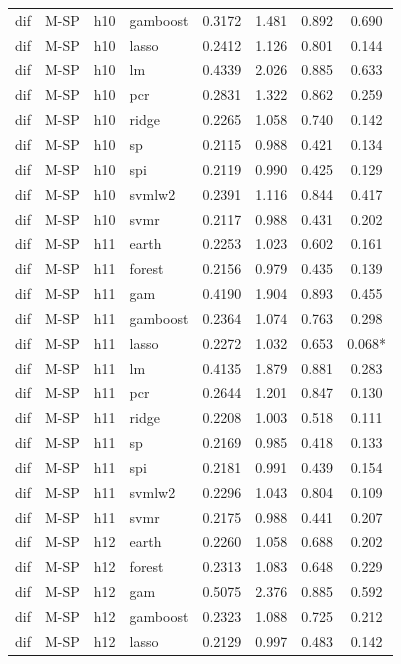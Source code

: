\begin{ThreePartTable}
\begin{longtable}[t]{llclcccc}
dif & M-SP & h10 & gamboost & 0.3172 & 1.481 & 0.892 & 0.690\\
dif & M-SP & h10 & lasso & 0.2412 & 1.126 & 0.801 & 0.144\\
dif & M-SP & h10 & lm & 0.4339 & 2.026 & 0.885 & 0.633\\
dif & M-SP & h10 & pcr & 0.2831 & 1.322 & 0.862 & 0.259\\
dif & M-SP & h10 & ridge & 0.2265 & 1.058 & 0.740 & 0.142\\
dif & M-SP & h10 & sp & 0.2115 & 0.988 & 0.421 & 0.134\\
dif & M-SP & h10 & spi & 0.2119 & 0.990 & 0.425 & 0.129\\
dif & M-SP & h10 & svmlw2 & 0.2391 & 1.116 & 0.844 & 0.417\\
dif & M-SP & h10 & svmr & 0.2117 & 0.988 & 0.431 & 0.202\\
\addlinespace
dif & M-SP & h11 & earth & 0.2253 & 1.023 & 0.602 & 0.161\\
dif & M-SP & h11 & forest & 0.2156 & 0.979 & 0.435 & 0.139\\
dif & M-SP & h11 & gam & 0.4190 & 1.904 & 0.893 & 0.455\\
dif & M-SP & h11 & gamboost & 0.2364 & 1.074 & 0.763 & 0.298\\
dif & M-SP & h11 & lasso & 0.2272 & 1.032 & 0.653 & 0.068*\\
dif & M-SP & h11 & lm & 0.4135 & 1.879 & 0.881 & 0.283\\
dif & M-SP & h11 & pcr & 0.2644 & 1.201 & 0.847 & 0.130\\
dif & M-SP & h11 & ridge & 0.2208 & 1.003 & 0.518 & 0.111\\
dif & M-SP & h11 & sp & 0.2169 & 0.985 & 0.418 & 0.133\\
dif & M-SP & h11 & spi & 0.2181 & 0.991 & 0.439 & 0.154\\
dif & M-SP & h11 & svmlw2 & 0.2296 & 1.043 & 0.804 & 0.109\\
dif & M-SP & h11 & svmr & 0.2175 & 0.988 & 0.441 & 0.207\\
\addlinespace
dif & M-SP & h12 & earth & 0.2260 & 1.058 & 0.688 & 0.202\\
dif & M-SP & h12 & forest & 0.2313 & 1.083 & 0.648 & 0.229\\
dif & M-SP & h12 & gam & 0.5075 & 2.376 & 0.885 & 0.592\\
dif & M-SP & h12 & gamboost & 0.2323 & 1.088 & 0.725 & 0.212\\
dif & M-SP & h12 & lasso & 0.2129 & 0.997 & 0.483 & 0.142\\

\end{longtable}
\end{ThreePartTable}
